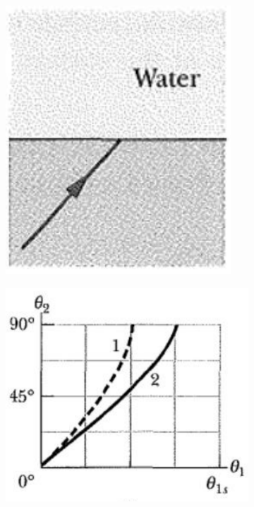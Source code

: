 \documentclass{zc-ust-hw}
\begin{document}
\begin{enumerate}
    \begin{figure}[H]
      \centering
      \begin{subfigure}[b]{.13333333333333333333\textwidth}
        \includegraphics[width=\textwidth]{figures/a.png}
        \caption{}
        \label{fig:a}
      \end{subfigure}
      \begin{subfigure}[b]{0.2\textwidth}
        \includegraphics[width=\textwidth]{figures/b.png}
        \caption{}
        \label{fig:b}
      \end{subfigure}
      \caption{}
    \end{figure}


\end{enumerate}
\end{document}
